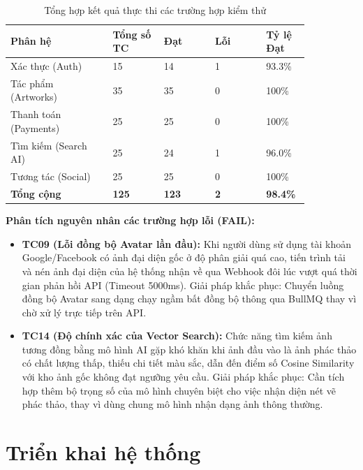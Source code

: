 \begin{table}[h!]
\caption{Tổng hợp kết quả thực thi các trường hợp kiểm thử}
\label{table:4_test_summary}
\centering
\small
\renewcommand{\arraystretch}{1.2}
\begin{tabular}{|p{0.3\linewidth}|p{0.15\linewidth}|p{0.15\linewidth}|p{0.15\linewidth}|p{0.1\linewidth}|}
\hline
\textbf{Phân hệ} & \textbf{Tổng số TC} & \textbf{Đạt} & \textbf{Lỗi} & \textbf{Tỷ lệ Đạt} \\ \hline
Xác thực (Auth) & 15 & 14 & 1 & 93.3\% \\ \hline
Tác phẩm (Artworks) & 35 & 35 & 0 & 100\% \\ \hline
Thanh toán (Payments) & 25 & 25 & 0 & 100\% \\ \hline
Tìm kiếm (Search AI) & 25 & 24 & 1 & 96.0\% \\ \hline
Tương tác (Social) & 25 & 25 & 0 & 100\% \\ \hline
\textbf{Tổng cộng} & \textbf{125} & \textbf{123} & \textbf{2} & \textbf{98.4\%} \\ \hline
\end{tabular}
\end{table}
\FloatBarrier

\textbf{Phân tích nguyên nhân các trường hợp lỗi (FAIL):}
\begin{itemize}
    \item \textbf{TC09 (Lỗi đồng bộ Avatar lần đầu):} Khi người dùng sử dụng tài khoản Google/Facebook có ảnh đại diện gốc ở độ phân giải quá cao, tiến trình tải và nén ảnh đại diện của hệ thống nhận về qua Webhook đôi lúc vượt quá thời gian phản hồi API (Timeout 5000ms). Giải pháp khắc phục: Chuyển luồng đồng bộ Avatar sang dạng chạy ngầm bất đồng bộ thông qua BullMQ thay vì chờ xử lý trực tiếp trên API.
    \item \textbf{TC14 (Độ chính xác của Vector Search):} Chức năng tìm kiếm ảnh tương đồng bằng mô hình AI gặp khó khăn khi ảnh đầu vào là ảnh phác thảo có chất lượng thấp, thiếu chi tiết màu sắc, dẫn đến điểm số Cosine Similarity với kho ảnh gốc không đạt ngưỡng yêu cầu. Giải pháp khắc phục: Cần tích hợp thêm bộ trọng số của mô hình chuyên biệt cho việc nhận diện nét vẽ phác thảo, thay vì dùng chung mô hình nhận dạng ảnh thông thường.
\end{itemize}

\section{Triển khai hệ thống}
\label{section:4.5}


